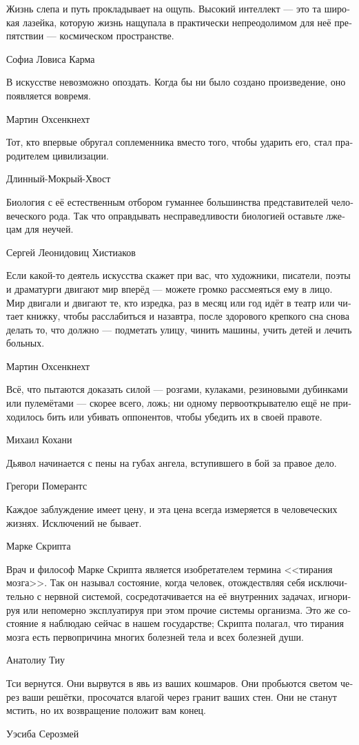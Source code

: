 \documentclass[a4paper,12pt,fleqn]{book}\usepackage{cooltooltips}\usepackage{polyglossia}\setdefaultlanguage[babelshorthands=true]{russian}\setotherlanguage{english}\defaultfontfeatures{Ligatures=TeX,Mapping=tex-text} \usepackage{xcolor}\definecolor{lightgray}{HTML}{bbbbbb}\color{lightgray}\newcommand{\ml}[3]{\textenglish{\textcolor{black}{#3}}}
\begin{document}
{\epigraph
{Жизнь слепа и путь прокладывает на ощупь.
Высокий интеллект --- это та широкая лазейка, которую жизнь нащупала в практически непреодолимом для неё препятствии --- космическом пространстве.}
{Софиа Ловиса Карма}

\epigraph
{В искусстве невозможно опоздать.
Когда бы ни было создано произведение, оно появляется вовремя.}
{Мартин Охсенкнехт}

\epigraph
{Тот, кто впервые обругал соплеменника вместо того, чтобы ударить его, стал прародителем цивилизации.}
{Длинный-Мокрый-Хвост}

\epigraph
{Биология с её естественным отбором гуманнее большинства представителей человеческого рода.
Так что оправдывать несправедливости биологией оставьте лжецам для неучей.}
{Сергей Леонидовиц Хистиаков}

\epigraph
{Если какой-то деятель искусства скажет при вас, что художники, писатели, поэты и драматурги двигают мир вперёд --- можете громко рассмеяться ему в лицо.
Мир двигали и двигают те, кто изредка, раз в месяц или год идёт в театр или читает книжку, чтобы расслабиться и назавтра, после здорового крепкого сна снова делать то, что должно --- подметать улицу, чинить машины, учить детей и лечить больных.}
{Мартин Охсенкнехт}

\epigraph
{Всё, что пытаются доказать силой --- розгами, кулаками, резиновыми дубинками или пулемётами --- скорее всего, ложь;
ни одному первооткрывателю ещё не приходилось бить или убивать оппонентов, чтобы убедить их в своей правоте.}
{Михаил Кохани}

\epigraph
{Дьявол начинается с пены на губах ангела, вступившего в бой за правое дело.}
{Грегори Померантс}

\epigraph
{Каждое заблуждение имеет цену, и эта цена всегда измеряется в человеческих жизнях.
Исключений не бывает.}
{Марке Скрипта}

\epigraph
{Врач и философ Марке Скрипта является изобретателем термина <<тирания мозга>>.
Так он называл состояние, когда человек, отождествляя себя исключительно с нервной системой, сосредотачивается на её внутренних задачах, игнорируя или непомерно эксплуатируя при этом прочие системы организма.
Это же состояние я наблюдаю сейчас в нашем государстве;
Скрипта полагал, что тирания мозга есть первопричина многих болезней тела и всех болезней души.}
{Анатолиу Тиу}

\epigraph
{Тси вернутся.
Они вырвутся в явь из ваших кошмаров.
Они пробьются светом через ваши решётки, просочатся влагой через гранит ваших стен.
Они не станут мстить, но их возвращение положит вам конец.}
{Уэсиба Серозмей}

}
\end{document}
